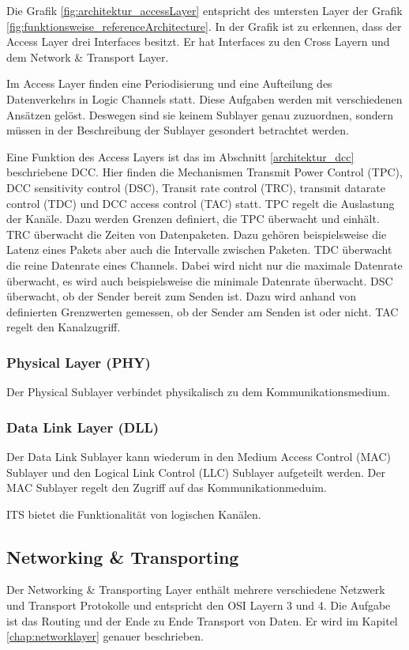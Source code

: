 Die Grafik \ref{fig:architektur_accessLayer} entspricht des untersten Layer der Grafik \ref{fig:funktionsweise_referenceArchitecture}. In der Grafik ist zu erkennen, dass der Access Layer drei Interfaces besitzt. Er hat Interfaces zu den Cross Layern und dem Network \& Transport Layer.


Im Access Layer finden eine Periodisierung und eine Aufteilung des Datenverkehrs in Logic Channels statt. Diese Aufgaben werden mit verschiedenen Ansätzen gelöst. Deswegen sind sie keinem Sublayer genau zuzuordnen, sondern müssen in der Beschreibung der Sublayer gesondert betrachtet werden.


Eine Funktion des Access Layers ist das im Abschnitt \ref{architektur_dcc} beschriebene \ac{DCC}. Hier finden die Mechanismen Transmit Power Control (TPC), \ac{DCC} sensitivity control (DSC), Transit rate control (TRC), transmit datarate control (TDC) und DCC access control (TAC) statt. TPC regelt die Auslastung der Kanäle. Dazu werden Grenzen definiert, die TPC überwacht und einhält. TRC überwacht die Zeiten von Datenpaketen. Dazu gehören beispielsweise die Latenz eines Pakets aber auch die Intervalle zwischen Paketen. TDC überwacht die reine Datenrate eines Channels. Dabei wird nicht nur die maximale Datenrate überwacht, es wird auch beispielsweise die minimale Datenrate überwacht. DSC überwacht, ob der Sender bereit zum Senden ist. Dazu wird anhand von definierten Grenzwerten gemessen, ob der Sender am Senden ist oder nicht. TAC regelt den Kanalzugriff. 

\subsubsection{Physical Layer (PHY)}
Der Physical Sublayer verbindet physikalisch zu dem Kommunikationsmedium.

\subsubsection{Data Link Layer (DLL)}
Der Data Link Sublayer kann wiederum in den Medium Access Control (MAC) Sublayer und den Logical Link Control (LLC) Sublayer aufgeteilt werden. Der MAC Sublayer regelt den Zugriff auf das Kommunikationmeduim.


\ac{ITS} bietet die Funktionalität von logischen Kanälen. 




\subsection{Networking \& Transporting \label{architektur_networkingTransporting}}
Der Networking \& Transporting Layer enthält mehrere verschiedene Netzwerk und Transport Protokolle und entspricht den \ac{OSI} Layern 3 und 4. Die Aufgabe ist das Routing und der Ende zu Ende Transport von Daten. Er wird im Kapitel \ref{chap:networklayer} genauer beschrieben. 


